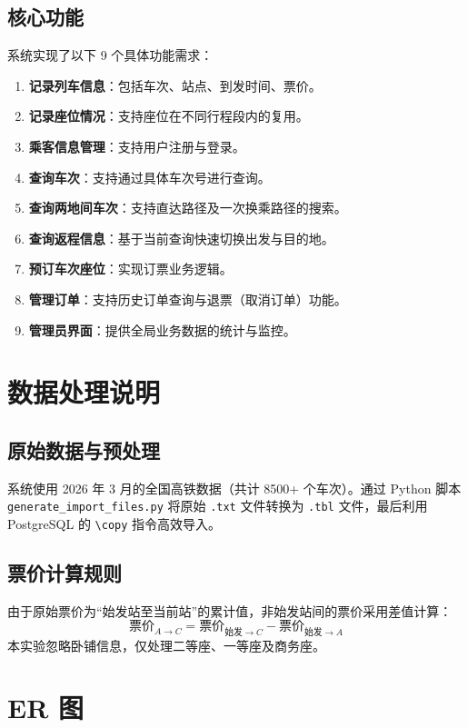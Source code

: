 \documentclass[10pt,a4paper]{article}
\begin{document}
\subsection{核心功能}
系统实现了以下 9 个具体功能需求：
\begin{enumerate}
    \item \textbf{记录列车信息}：包括车次、站点、到发时间、票价。
    \item \textbf{记录座位情况}：支持座位在不同行程段内的复用。
    \item \textbf{乘客信息管理}：支持用户注册与登录。
    \item \textbf{查询车次}：支持通过具体车次号进行查询。
    \item \textbf{查询两地间车次}：支持直达路径及一次换乘路径的搜索。
    \item \textbf{查询返程信息}：基于当前查询快速切换出发与目的地。
    \item \textbf{预订车次座位}：实现订票业务逻辑。
    \item \textbf{管理订单}：支持历史订单查询与退票（取消订单）功能。
    \item \textbf{管理员界面}：提供全局业务数据的统计与监控。
\end{enumerate}

\section{数据处理说明}

\subsection{原始数据与预处理}
系统使用 2026 年 3 月的全国高铁数据（共计 8500+ 个车次）。通过 Python 脚本 \texttt{generate\_import\_files.py} 将原始 \texttt{.txt} 文件转换为 \texttt{.tbl} 文件，最后利用 PostgreSQL 的 \texttt{\textbackslash copy} 指令高效导入。

\subsection{票价计算规则}
由于原始票价为“始发站至当前站”的累计值，非始发站间的票价采用差值计算：
\[ \text{票价}_{A \to C} = \text{票价}_{\text{始发} \to C} - \text{票价}_{\text{始发} \to A} \]
本实验忽略卧铺信息，仅处理二等座、一等座及商务座。

\section{ER 图}
\end{document}
